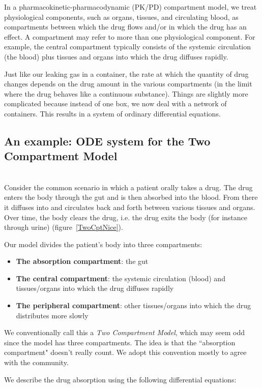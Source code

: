 \documentclass[11pt]{amsart}
\begin{document}
In a pharmacokinetic-pharmacodynamic (PK/PD) compartment model, we treat physiological
components, such as organs, tissues, and circulating blood, as compartments between which
the drug flows and/or in which the drug has an effect. A compartment may refer to more than  
one physiological component. For example, the central compartment typically consists of the 
systemic circulation (the blood) plus tissues and organs into which the drug diffuses rapidly.

Just like our leaking gas in a container, the rate at which the quantity of drug changes depends
on the drug amount in the various compartments (in the limit where the drug behaves like a 
continuous substance). Things are slightly more complicated because instead of one box, 
we now deal with a network of containers. This results in a system of ordinary differential equations.

\subsection{An example: ODE system for the Two Compartment Model} \ \\

Consider the common scenario in which a patient orally takes a drug. The drug enters the body
through the gut and is then absorbed into the blood. From there it diffuses into and circulates back
and forth between various tissues and organs. Over time, the body clears the drug, i.e. the drug exits 
the body (for instance through urine)  (figure~\ref{TwoCptNice}).

Our model divides the patient's body into three compartments:
\begin{itemize}
  \item \textbf{The absorption compartment}: the gut
  \item \textbf{The central compartment}: the systemic circulation (blood) and tissues/organs 
  into which the drug diffuses rapidly
  \item \textbf{The peripheral compartment}: other tissues/organs into which the drug 
  distributes more slowly
\end{itemize}

We conventionally call this a \textit{Two Compartment Model}, which may seem odd since
 the model has three compartments. The idea is that the ``absorption compartment" doesn't
 really count. We adopt this convention mostly to agree with the community.

We describe the drug absorption using the following differential equations:
\end{document}
